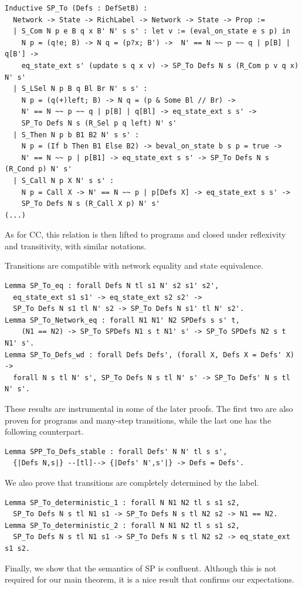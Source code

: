 \documentclass[runningheads]{llncs}
\begin{document}
\begin{lstlisting}
Inductive SP_To (Defs : DefSetB) :
  Network -> State -> RichLabel -> Network -> State -> Prop :=
  | S_Com N p e B q x B' N' s s' : let v := (eval_on_state e s p) in
    N p = (q!e; B) -> N q = (p?x; B') ->  N' == N ~~ p ~~ q | p[B] | q[B'] ->
    eq_state_ext s' (update s q x v) -> SP_To Defs N s (R_Com p v q x) N' s'
  | S_LSel N p B q Bl Br N' s s' :
    N p = (q(+)left; B) -> N q = (p & Some Bl // Br) ->
    N' == N ~~ p ~~ q | p[B] | q[Bl] -> eq_state_ext s s' ->
    SP_To Defs N s (R_Sel p q left) N' s'
  | S_Then N p b B1 B2 N' s s' :
    N p = (If b Then B1 Else B2) -> beval_on_state b s p = true ->
    N' == N ~~ p | p[B1] -> eq_state_ext s s' -> SP_To Defs N s (R_Cond p) N' s'
  | S_Call N p X N' s s' :
    N p = Call X -> N' == N ~~ p | p[Defs X] -> eq_state_ext s s' ->
    SP_To Defs N s (R_Call X p) N' s'                                     (...)
\end{lstlisting}
As for CC, this relation is then lifted to programs and closed under reflexivity and transitivity, with similar notations.

Transitions are compatible with network equality and state equivalence.
\begin{lstlisting}
Lemma SP_To_eq : forall Defs N tl s1 N' s2 s1' s2',
  eq_state_ext s1 s1' -> eq_state_ext s2 s2' ->
  SP_To Defs N s1 tl N' s2 -> SP_To Defs N s1' tl N' s2'.
Lemma SP_To_Network_eq : forall N1 N1' N2 SPDefs s s' t,
    (N1 == N2) -> SP_To SPDefs N1 s t N1' s' -> SP_To SPDefs N2 s t N1' s'.
Lemma SP_To_Defs_wd : forall Defs Defs', (forall X, Defs X = Defs' X) ->
  forall N s tl N' s', SP_To Defs N s tl N' s' -> SP_To Defs' N s tl N' s'.
\end{lstlisting}
These results are instrumental in some of the later proofs.
The first two are also proven for programs and many-step transitions, while the last one has the
following counterpart.
\begin{lstlisting}
Lemma SPP_To_Defs_stable : forall Defs' N N' tl s s',
  {|Defs N,s|} --[tl]--> {|Defs' N',s'|} -> Defs = Defs'.
\end{lstlisting}

We also prove that transitions are completely determined by the label.
\begin{lstlisting}
Lemma SP_To_deterministic_1 : forall N N1 N2 tl s s1 s2,
  SP_To Defs N s tl N1 s1 -> SP_To Defs N s tl N2 s2 -> N1 == N2.
Lemma SP_To_deterministic_2 : forall N N1 N2 tl s s1 s2,
  SP_To Defs N s tl N1 s1 -> SP_To Defs N s tl N2 s2 -> eq_state_ext s1 s2.
\end{lstlisting}
Finally, we show that the semantics of SP is confluent.
Although this is not required for our main theorem, it is a nice result that confirms our
expectations.
\end{document}

